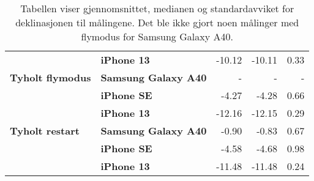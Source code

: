 \begin{table}[h!]
\begin{tabular}{llrrr}
                                            & \textbf{iPhone 13}                      & -10.12                                                                      & -10.11                                                                & 0.33                                                                         \\
    \textbf{Tyholt flymodus}                & \textbf{Samsung Galaxy A40}                       & -                                                                           & -                                                                     & -                                                                            \\
                                            & \textbf{iPhone SE}                   & -4.27                                                                       & -4.28                                                                 & 0.66                                                                         \\
                                            & \textbf{iPhone 13}                      & -12.16                                                                      & -12.15                                                                & 0.29                                                                         \\
    \rowcolor[HTML]{C0C0C0} 
    \textbf{Tyholt restart}                 & \textbf{Samsung Galaxy A40}                       & -0.90                                                                       & -0.83                                                                 & 0.67                                                                         \\
    \rowcolor[HTML]{C0C0C0} 
                                            & \textbf{iPhone SE}                   & -4.58                                                                       & -4.68                                                                 & 0.98                                                                         \\
    \rowcolor[HTML]{C0C0C0} 
                                            & \textbf{iPhone 13}                      & -11.48                                                                      & -11.48                                                                & 0.24                                                                        
    \end{tabular}
    \caption{Tabellen viser gjennomsnittet, medianen og standardavviket for deklinasjonen til målingene. Det ble ikke gjort noen målinger med flymodus for Samsung Galaxy A40.}
\end{table}